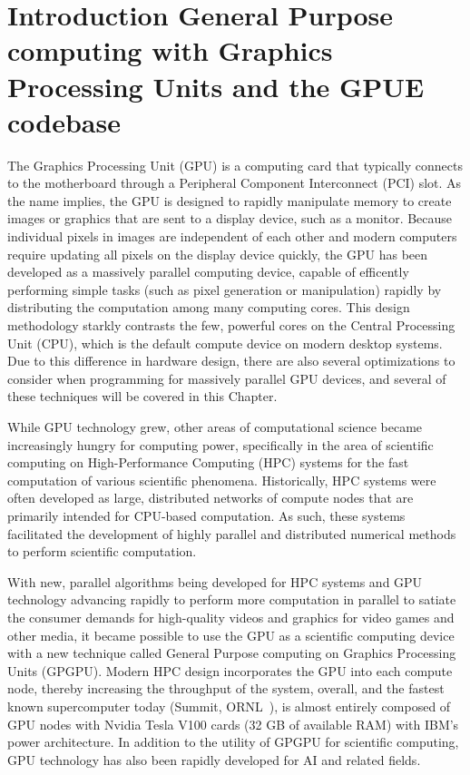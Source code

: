 \chapter{Introduction General Purpose computing with Graphics Processing Units and the GPUE codebase}
\label{ch:gpu}

The Graphics Processing Unit (GPU) is a computing card that typically connects to the motherboard through a Peripheral Component Interconnect (PCI) slot.
As the name implies, the GPU is designed to rapidly manipulate memory to create images or graphics that are sent to a display device, such as a monitor.
Because individual pixels in images are independent of each other and modern computers require updating all pixels on the display device quickly, the GPU has been developed as a massively parallel computing device, capable of efficently performing simple tasks (such as pixel generation or manipulation) rapidly by distributing the computation among many computing cores.
This design methodology starkly contrasts the few, powerful cores on the Central Processing Unit (CPU), which is the default compute device on modern desktop systems.
Due to this difference in hardware design, there are also several optimizations to consider when programming for massively parallel GPU devices, and several of these techniques will be covered in this Chapter.

While GPU technology grew, other areas of computational science became increasingly hungry for computing power, specifically in the area of scientific computing on High-Performance Computing (HPC) systems for the fast computation of various scientific phenomena.
Historically, HPC systems were often developed as large, distributed networks of compute nodes that are primarily intended for CPU-based computation.
As such, these systems facilitated the development of highly parallel and distributed numerical methods to perform scientific computation.

With new, parallel algorithms being developed for HPC systems and GPU technology advancing rapidly to perform more computation in parallel to satiate the consumer demands for high-quality videos and graphics for video games and other media, it became possible to use the GPU as a scientific computing device with a new technique called General Purpose computing on Graphics Processing Units (GPGPU).
Modern HPC design incorporates the GPU into each compute node, thereby increasing the throughput of the system, overall, and the fastest known supercomputer today (Summit, ORNL~\cite{kahle2019}), is almost entirely composed of GPU nodes with Nvidia Tesla V100 cards (32 GB of available RAM) with IBM's power architecture.
In addition to the utility of GPGPU for scientific computing, GPU technology has also been rapidly developed for AI and related fields.

